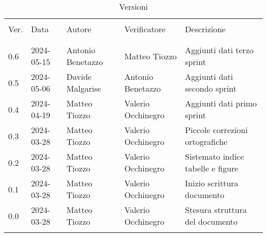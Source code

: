 \documentclass[12pt]{article} %
\begin{document}


\newpage



\begin{table}[!h]
	\footnotesize
	\begin{center}
		\caption*{Versioni}
		\vspace{0.5cm}
		\begin{tabular}{ l l l l p{6cm} }
			\hline                                                                                          \\[-2ex]
			Ver. & Data       & Autore             & Verificatore       & Descrizione                       \\
			\\[-2ex] \hline \\[-1.5ex]
			0.6  & 2024-05-15 & Antonio Benetazzo  & Matteo Tiozzo      & Aggiunti dati terzo sprint        \\
			0.5  & 2024-05-06 & Davide Malgarise   & Antonio Benetazzo  & Aggiunti dati secondo sprint      \\
			0.4  & 2024-04-19 & Matteo Tiozzo      & Valerio Occhinegro & Aggiunti dati primo sprint        \\
			0.3  & 2024-03-28 & Matteo Tiozzo      & Valerio Occhinegro & Piccole correzioni ortografiche   \\
			0.2  & 2024-03-28 & Matteo Tiozzo      & Valerio Occhinegro & Sistemato indice tabelle e figure \\
			0.1  & 2024-03-28 & Matteo Tiozzo      & Valerio Occhinegro & Inizio scrittura documento        \\
			0.0  & 2024-03-28 & Matteo Tiozzo      & Valerio Occhinegro & Stesura struttura del documento   \\
			\\[-1.5ex] \hline
		\end{tabular}
	\end{center}
\end{table}

\newpage

\tableofcontents

\newpage

\listoftables

\listoffigures

\newpage



\newpage



\newpage



\newpage



\newpage


\end{document}
